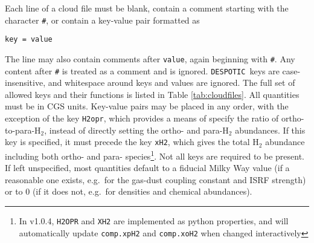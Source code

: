 \documentclass[12pt]{article}
\newcommand{\despotic}{\texttt{DESPOTIC}}
\begin{document}
Each line of a cloud file must be blank, contain a comment starting with the character \verb=#=, or contain a key-value pair formatted as
\begin{verbatim}
key = value
\end{verbatim}
The line may also contain comments after \verb=value=, again beginning with \verb=#=. Any content after \verb=#= is treated as a comment and is ignored. \despotic\ keys are case-insensitive, and whitespace around keys and values are ignored. The full set of allowed keys and their functions is listed in Table \ref{tab:cloudfiles}. All quantities must be in CGS units. Key-value pairs may be placed in any order, with the exception of the key \verb=H2opr=, which provides a means of specify the ratio of ortho-to-para-H$_2$, instead of directly setting the ortho- and para-H$_2$ abundances. If this key is specified, it must precede the key \verb=xH2=, which gives the total H$_2$ abundance including both ortho- and para- species\footnote{In v1.0.4, \texttt{H2OPR} and \texttt{XH2} are implemented as python properties, and will automatically update \texttt{comp.xpH2} and \texttt{comp.xoH2} when changed interactively}. Not all keys are required to be present. If left unspecified, most quantities default to a fiducial Milky Way value (if a reasonable one exists, e.g.~for the gas-dust coupling constant and ISRF strength) or to 0 (if it does not, e.g.~for densities and chemical abundances).
\end{document}

